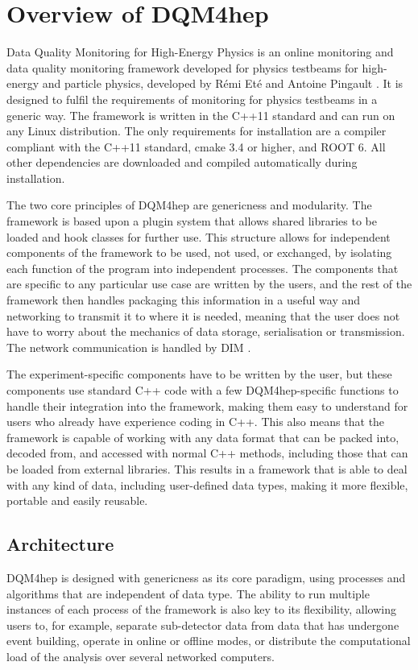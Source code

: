 \section{Overview of DQM4hep}
Data Quality Monitoring for High-Energy Physics is an online monitoring and data quality monitoring framework developed for physics testbeams for high-energy and particle physics, developed by R\'{e}mi Et\'{e} and Antoine Pingault \cite{aida2020-milestone-dqm4hep}. It is designed to fulfil the requirements of monitoring for physics testbeams in a generic way. The framework is written in the C++11 standard and can run on any Linux distribution. The only requirements for installation are a compiler compliant with the C++11 standard, cmake 3.4 or higher, and ROOT 6. All other dependencies are downloaded and compiled automatically during installation. 

The two core principles of \acrshort{DQM4hep} are genericness and modularity. The framework is based upon a plugin system that allows shared libraries to be loaded and hook classes for further use. This structure allows for independent components of the framework to be used, not used, or exchanged, by isolating each function of the program into independent processes. The components that are specific to any particular use case are written by the users, and the rest of the framework then handles packaging this information in a useful way and networking to transmit it to where it is needed, meaning that the user does not have to worry about the mechanics of data storage, serialisation or transmission. The network communication is handled by \acrfull{DIM} \cite{dim-article}.

The experiment-specific components have to be written by the user, but these components use standard C++ code with a few \acrshort{DQM4hep}-specific functions to handle their integration into the framework, making them easy to understand for users who already have experience coding in C++. This also means that the framework is capable of working with any data format that can be packed into, decoded from, and accessed with normal C++ methods, including those that can be loaded from external libraries. This results in a framework that is able to deal with any kind of data, including user-defined data types, making it more flexible, portable and easily reusable.

\subsection{Architecture}
\acrshort{DQM4hep} is designed with genericness as its core paradigm, using processes and algorithms that are independent of data type. The ability to run multiple instances of each process of the framework is also key to its flexibility, allowing users to, for example, separate sub-detector data from data that has undergone event building, operate in online or offline modes, or distribute the computational load of the analysis over several networked computers.

